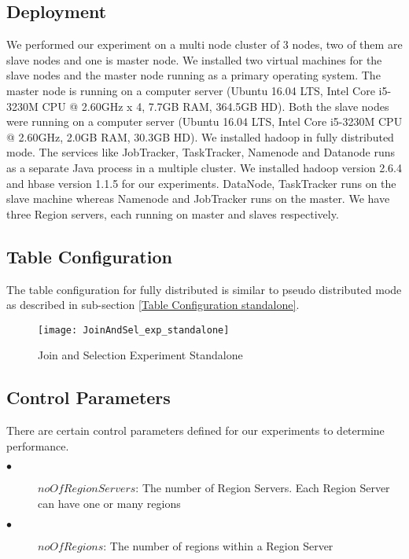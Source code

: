 \documentclass[11pt,a4paper,bibtotoc,idxtotoc,headsepline,footsepline,footexclude,BCOR12mm,DIV13]{scrbook}
\begin{document}
\subsection{Deployment}
We performed our experiment on a multi node cluster of 3 nodes, two of them are slave nodes and one is master node. We installed two virtual machines for the slave nodes and the master node running as a primary operating system. The master node is running on a computer server (Ubuntu 16.04 LTS, Intel Core i5-3230M CPU @ 2.60GHz x 4, 7.7GB RAM, 364.5GB HD). Both the slave nodes were running on a computer server (Ubuntu 16.04 LTS, Intel Core i5-3230M CPU @ 2.60GHz, 2.0GB RAM, 30.3GB HD). We installed hadoop in fully distributed mode. The services like JobTracker, TaskTracker, Namenode and Datanode runs as a separate Java process in a multiple cluster. We installed hadoop version 2.6.4 and hbase version 1.1.5 for our experiments. DataNode, TaskTracker runs on the slave machine whereas Namenode and JobTracker runs on the master. We have three Region servers, each running on master and slaves respectively.

\subsection{Table Configuration}
The table configuration for fully distributed is similar to pseudo distributed mode as described in sub-section \ref{Table Configuration standalone}.

\begin{figure}
	\centering
	\texttt{[image: JoinAndSel\_exp\_standalone]}
	\caption{Join and Selection Experiment Standalone}
	\label{sec:JoinSelExpStandalone}
	
\end{figure} 
\newpage

\subsection{Control Parameters}
\label{Control Parameter Distributed}
There are certain control parameters defined for our experiments to determine performance.

\begin{description}
	\item[$\bullet$]  $noOfRegionServers$: The number of Region Servers. Each Region Server can have one or many regions
\end{description}

\begin{description}
	\item[$\bullet$]  $noOfRegions$: The number of regions within a Region Server 
\end{description}
\end{document}
